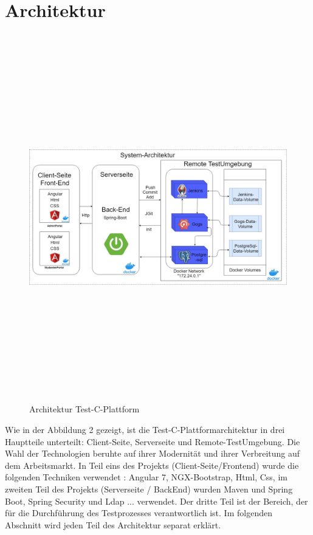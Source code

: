 \documentclass[a4paper,12pt,oneside]{book}
\begin{document}
\section{Architektur}
\begin{figure}[h!]
	\begin{center}
		\includegraphics[width=16cm, height=16cm]{Test-C-Plattform-Arch.jpg}
		\caption{Architektur Test-C-Plattform } 
		\label{ Architektur Test-C-Plattform } 
	\end{center}
\end{figure}
Wie in der Abbildung 2 gezeigt, ist die Test-C-Plattformarchitektur in drei Hauptteile unterteilt: Client-Seite, Serverseite und Remote-TestUmgebung.
\newline
Die Wahl der Technologien beruhte auf ihrer Modernität und ihrer Verbreitung auf dem Arbeitsmarkt. In Teil eins des Projekts (Client-Seite/Frontend) wurde die folgenden Techniken verwendet : Angular 7, NGX-Bootstrap, Html, Css, im zweiten Teil des Projekts (Serverseite / BackEnd) wurden Maven und Spring Boot, Spring Security und Ldap ... verwendet. Der dritte Teil ist der Bereich, der für die Durchführung des Testprozesses verantwortlich ist.
\newline
Im folgenden Abschnitt wird jeden Teil des Architektur separat erklärt.
\end{document}
